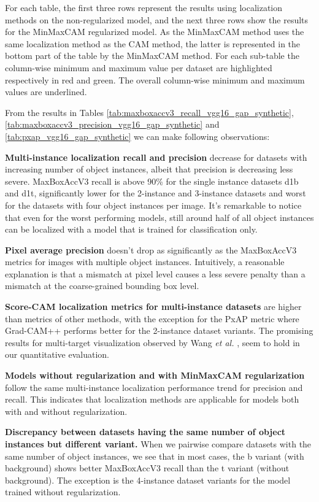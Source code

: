 For each table, the first three rows represent the results using localization methods on the non-regularized model, and the next three rows show the results for the MinMaxCAM regularized model. As the MinMaxCAM method uses the same localization method as the CAM method, the latter is represented in the bottom part of the table by the MinMaxCAM method. For each sub-table the column-wise minimum and maximum value per dataset are highlighted respectively in red and green. The overall column-wise minimum and maximum values are underlined. 

From the results in Tables \ref{tab:maxboxaccv3_recall_vgg16_gap_synthetic}, \ref{tab:maxboxaccv3_precision_vgg16_gap_synthetic} and \ref{tab:pxap_vgg16_gap_synthetic} we can make following observations:

\textbf{Multi-instance localization recall and precision} decrease for datasets with increasing number of object instances, albeit that precision is decreasing less severe. MaxBoxAccV3 recall is above 90\% for the single instance datasets d1b and d1t, significantly lower for the 2-instance and 3-instance datasets and worst for the datasets with four object instances per image. It's remarkable to notice that even for the worst performing models, still around half of all object instances can be localized with a model that is trained for classification only. 

\textbf{Pixel average precision} doesn't drop as significantly as the MaxBoxAccV3 metrics for images with multiple object instances. Intuitively, a reasonable explanation is that a mismatch at pixel level causes a less severe penalty than a mismatch at the coarse-grained bounding box level.

\textbf{Score-CAM localization metrics for multi-instance datasets} are higher than metrics of other methods, with the exception for the PxAP metric where Grad-CAM++ performs better for the 2-instance dataset variants. The promising results for multi-target visualization observed by Wang \textit{et al.} \cite{wang2020score}, seem to hold in our quantitative evaluation. 

\textbf{Models without regularization and with MinMaxCAM regularization} follow the same multi-instance localization performance trend for precision and recall. This indicates that localization methods are applicable for models both with and without regularization.

\textbf{Discrepancy between datasets having the same number of object instances but different variant.} When we pairwise compare datasets with the same number of object instances, we see that in most cases, the b variant (with background) shows better MaxBoxAccV3 recall than the t variant (without background). The exception is the 4-instance dataset variants for the model trained without regularization.

